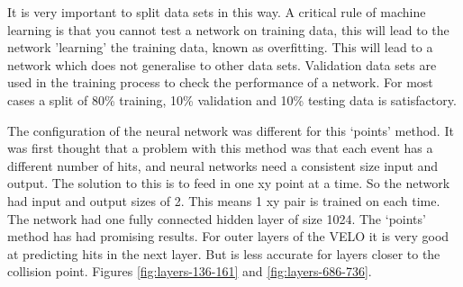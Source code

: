 It is very important to split data sets in this way. A critical rule of machine learning is that you cannot test a network on training data, this will lead to the network 'learning' the training data, known as overfitting. This will lead to a network which does not generalise to other data sets. Validation data sets are used in the training process to check the performance of a network. For most cases a split of 80\% training, 10\% validation and 10\% testing data is satisfactory.

The configuration of the neural network was different for this ‘points’ method. It was first thought that a problem with this method was that each event has a different number of hits, and neural networks need a consistent size input and output. The solution to this is to feed in one xy point at a time. So the network had input and output sizes of 2. This means 1 xy pair is trained on each time. The network had one fully connected hidden layer of size 1024.
The ‘points’ method has had promising results. For outer layers of the VELO it is very good at predicting hits in the next layer. But is less accurate for layers closer to the collision point. Figures \ref{fig:layers-136-161} and \ref{fig:layers-686-736}.

